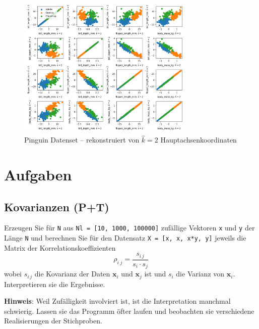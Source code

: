 \documentclass[]{book}
\theoremstyle{definition}
\theoremstyle{definition}
\theoremstyle{definition}
\theoremstyle{definition}
\theoremstyle{remark}
\begin{document}
\begin{figure}
\hypertarget{fig:05-penguin-allpairs-k2-rec}{%
\centering
\includegraphics[width=0.75\textwidth,height=\textheight]{bilder/05-all-pairs-k2-rec.png}
\caption{Pinguin Datenset -- rekonstruiert von \(\hat k =2\) Hauptachsenkoordinaten}\label{fig:05-penguin-allpairs-k2-rec}
}
\end{figure}

\hypertarget{aufgaben-2}{%
\section{Aufgaben}\label{aufgaben-2}}

\hypertarget{kovarianzen-pt}{%
\subsection{Kovarianzen (P+T)}\label{kovarianzen-pt}}

Erzeugen Sie für \texttt{N} aus \texttt{Nl\ =\ {[}10,\ 1000,\ 100000{]}} zufällige Vektoren \texttt{x} und \texttt{y} der Länge \texttt{N} und berechnen Sie
für den Datensatz \texttt{X\ =\ {[}x,\ x,\ x*y,\ y{]}}
jeweils die Matrix der Korrelationskoeffizienten
\begin{equation*}
\rho _{i\;j} = \frac{s_{i\, j}}{s_i \cdot s_j}
\end{equation*}
wobei \(s_{i\,j}\) die Kovarianz der Daten \({\mathbf{x} _ i}\) und \({\mathbf{x} _ j}\) ist und \(s_{i}\) die Varianz von \({\mathbf{x} _ i}\). Interpretieren sie die Ergebnisse.

\textbf{Hinweis}: Weil Zufälligkeit involviert ist, ist die Interpretation manchmal schwierig. Lassen sie das Programm öfter laufen und beobachten sie verschiedene Realisierungen der Stichproben.
\end{document}
